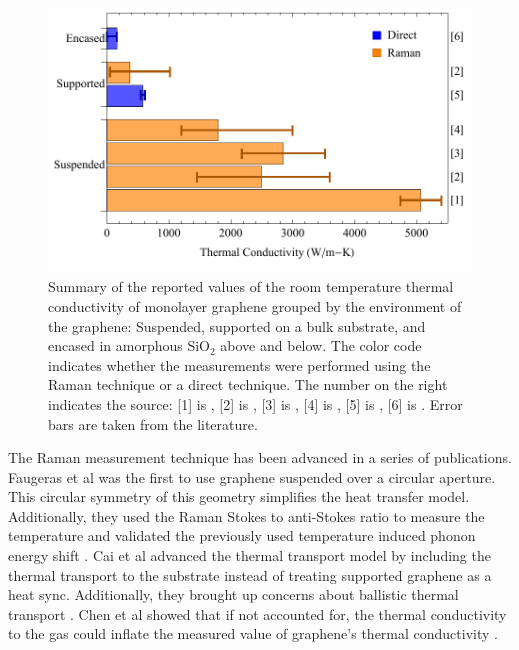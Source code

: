 \begin{figure}
	\begin{center}
	\includegraphics{Figs_Thermal/Thermal_lit.pdf}
	\end{center}
	\caption[Summary of the reported values of the room temperature thermal conductivity of monolayer graphene]{
	\label{fig:therm:lit}
		Summary of the reported values of the room temperature thermal conductivity of monolayer graphene grouped by the environment of the graphene: Suspended, supported on a bulk substrate, and encased in amorphous SiO$_2$ above and below.
		The color code indicates whether the measurements were performed using the Raman technique or a direct technique.
		The number on the right indicates the source: [1] is \cite{Balandin2008}, [2] is \cite{Cai2010}, [3] is \cite{Chen2011a}, [4] is \cite{Lee2011}, [5] is \cite{Seol2010}, [6] is \cite{Jang2010}.
		Error bars are taken from the literature.
	}
\end{figure}

The Raman measurement technique has been advanced in a series of publications.
Faugeras et al was the first to use graphene suspended over a circular aperture.
This circular symmetry of this geometry simplifies the heat transfer model.
Additionally, they used the Raman Stokes to anti-Stokes ratio to measure the temperature and validated the previously used temperature induced phonon energy shift \cite{Faugeras2010}.
Cai et al advanced the thermal transport model by including the thermal transport to the substrate instead of treating supported graphene as a heat sync.
Additionally, they brought up concerns about ballistic thermal transport \cite{Cai2010}.
Chen et al showed that if not accounted for, the thermal conductivity to the gas could inflate the measured value of graphene's thermal conductivity \cite{Chen2011a}.

